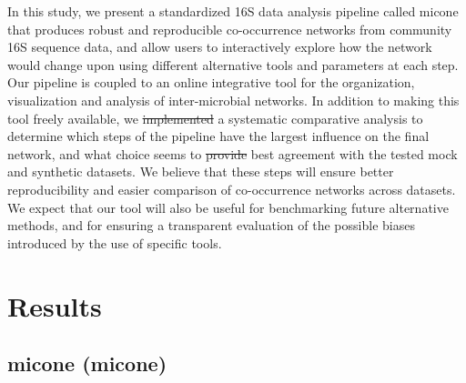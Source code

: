 \documentclass[letterpaper,12pt]{article}
\providecommand{\DIFaddtex}[1]{{\protect\color{blue}\uwave{#1}}} %
\providecommand{\DIFdeltex}[1]{{\protect\color{red}\sout{#1}}}                      %
\providecommand{\DIFaddbegin}{} %
\providecommand{\DIFaddend}{} %
\providecommand{\DIFdelbegin}{} %
\providecommand{\DIFdelend}{} %
\providecommand{\DIFadd}[1]{\texorpdfstring{\DIFaddtex{#1}}{#1}} %
\providecommand{\DIFdel}[1]{\texorpdfstring{\DIFdeltex{#1}}{}} %
\newcommand{\DIFscaledelfig}{0.5}
\newlength{\DIFdelgraphicswidth} %
\newlength{\DIFdelgraphicsheight} %
\newcommand{\DIFaddincludegraphics}[2][]{{\color{blue}\fbox{\DIFOincludegraphics[#1]{#2}}}} %
\newcommand{\DIFdelincludegraphics}[2][]{%
\sbox{\DIFdelgraphicsbox}{\DIFOincludegraphics[#1]{#2}}%
\settoboxwidth{\DIFdelgraphicswidth}{\DIFdelgraphicsbox} %
\settoboxtotalheight{\DIFdelgraphicsheight}{\DIFdelgraphicsbox} %
\scalebox{\DIFscaledelfig}{%
\parbox[b]{\DIFdelgraphicswidth}{\usebox{\DIFdelgraphicsbox}\\[-\baselineskip] \rule{\DIFdelgraphicswidth}{0em}}\llap{\resizebox{\DIFdelgraphicswidth}{\DIFdelgraphicsheight}{%
\setlength{\unitlength}{\DIFdelgraphicswidth}%
\begin{picture}(1,1)%
\thicklines\linethickness{2pt} %
{\color[rgb]{1,0,0}\put(0,0){\framebox(1,1){}}}%
{\color[rgb]{1,0,0}\put(0,0){\line( 1,1){1}}}%
{\color[rgb]{1,0,0}\put(0,1){\line(1,-1){1}}}%
\end{picture}%
}\hspace*{3pt}}} %
} %
\DeclareRobustCommand{\DIFaddbegin}{\DIFOaddbegin \let\includegraphics\DIFaddincludegraphics} %
\DeclareRobustCommand{\DIFaddend}{\DIFOaddend \let\includegraphics\DIFOincludegraphics} %
\DeclareRobustCommand{\DIFdelbegin}{\DIFOdelbegin \let\includegraphics\DIFdelincludegraphics} %
\DeclareRobustCommand{\DIFdelend}{\DIFOaddend \let\includegraphics\DIFOincludegraphics} %
\begin{document}
 In this study, we present a standardized 16S data analysis pipeline called \ac{micone} that produces robust and reproducible co-occurrence networks from community 16S sequence data, and allow users to interactively explore how the network would change upon using different alternative tools and parameters at each step.
  Our pipeline is coupled to an online integrative tool for the organization, visualization and analysis of inter-microbial networks.
  In addition to making this tool freely available, we \DIFdelbegin \DIFdel{implemented }\DIFdelend \DIFaddbegin \DIFadd{completed }\DIFaddend a systematic comparative analysis to determine which steps of the pipeline have the largest influence on the final network, and what choice seems to \DIFdelbegin \DIFdel{provide }\DIFdelend \DIFaddbegin \DIFadd{have the }\DIFaddend best agreement with the tested mock and synthetic datasets.
  We believe that these steps will ensure better reproducibility and easier comparison of co-occurrence networks across datasets.
  We expect that our tool will also be useful for benchmarking future alternative methods, and for ensuring a transparent evaluation of the possible biases introduced by the use of specific tools.



\section*{Results}

  \subsection*{\acl{micone} (\acs{micone})}
\end{document}
